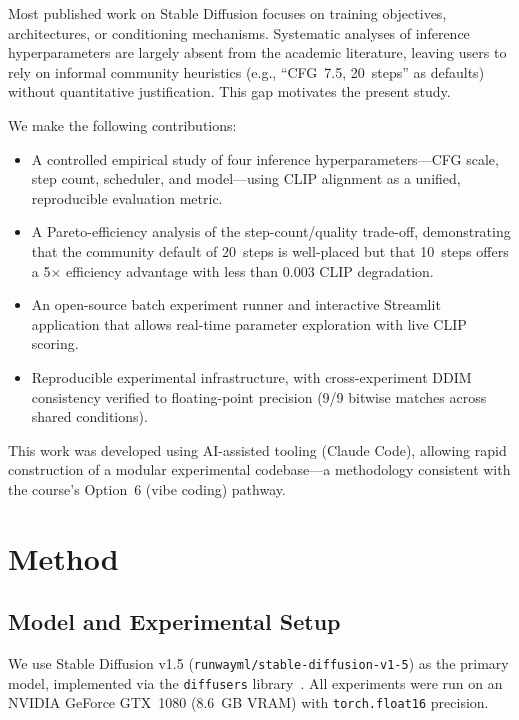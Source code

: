 \documentclass{article}
\begin{document}
Most published work on Stable Diffusion focuses on training objectives, architectures,
or conditioning mechanisms.
Systematic analyses of inference hyperparameters are largely absent from the
academic literature, leaving users to rely on informal community heuristics
(e.g., ``CFG~7.5, 20~steps'' as defaults) without quantitative justification.
This gap motivates the present study.

We make the following contributions:
\begin{itemize}
\item A controlled empirical study of four inference hyperparameters---CFG scale,
  step count, scheduler, and model---using CLIP alignment as a unified,
  reproducible evaluation metric.
\item A Pareto-efficiency analysis of the step-count/quality trade-off,
  demonstrating that the community default of 20~steps is well-placed but
  that 10~steps offers a 5$\times$ efficiency advantage with less than 0.003
  CLIP degradation.
\item An open-source batch experiment runner and interactive Streamlit application
  that allows real-time parameter exploration with live CLIP scoring.
\item Reproducible experimental infrastructure, with cross-experiment DDIM
  consistency verified to floating-point precision (9/9 bitwise matches
  across shared conditions).
\end{itemize}

This work was developed using AI-assisted tooling (Claude Code), allowing rapid
construction of a modular experimental codebase---a methodology consistent with
the course's Option~6 (vibe coding) pathway.

\section{Method}

\subsection{Model and Experimental Setup}

We use Stable Diffusion v1.5 (\texttt{runwayml/stable-diffusion-v1-5}) as the
primary model, implemented via the \texttt{diffusers} library~\citep{platen2022diffusers}.
All experiments were run on an NVIDIA GeForce GTX~1080 (8.6~GB VRAM) with
\texttt{torch.float16} precision.
\end{document}
